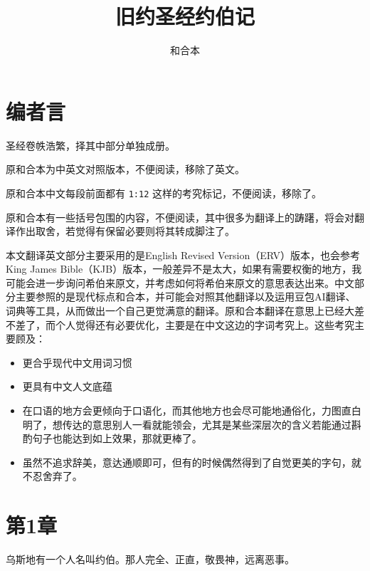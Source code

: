 \documentclass[12pt,oneside]{book}
\title{旧约圣经约伯记}
\author{和合本}
\begin{document}





\frontmatter
{}
\chapter*{编者言}
圣经卷帙浩繁，择其中部分单独成册。

原和合本为中英文对照版本，不便阅读，移除了英文。

原和合本中文每段前面都有 \verb+1:12+ 这样的考究标记，不便阅读，移除了。

原和合本有一些括号包围的内容，不便阅读，其中很多为翻译上的踌躇，将会对翻译作出取舍，若觉得有保留必要则将其转成脚注了。

本文翻译英文部分主要采用的是English Revised Version（ERV）版本，也会参考King James Bible（KJB）版本，一般差异不是太大，如果有需要权衡的地方，我可能会进一步询问希伯来原文，并考虑如何将希伯来原文的意思表达出来。中文部分主要参照的是现代标点和合本，并可能会对照其他翻译以及运用豆包AI翻译、词典等工具，从而做出一个自己更觉满意的翻译。原和合本翻译在意思上已经大差不差了，而个人觉得还有必要优化，主要是在中文这边的字词考究上。这些考究主要顾及：


\begin{itemize}
\item 更合乎现代中文用词习惯
\item 更具有中文人文底蕴
\item 在口语的地方会更倾向于口语化，而其他地方也会尽可能地通俗化，力图直白明了，想传达的意思别人一看就能领会，尤其是某些深层次的含义若能通过斟酌句子也能达到如上效果，那就更棒了。
\item 虽然不追求辞美，意达通顺即可，但有的时候偶然得到了自觉更美的字句，就不忍舍弃了。
\end{itemize}



\setcounter{tocdepth}{2}    
\tableofcontents

\mainmatter
\chapter{第1章}
乌斯地有一个人名叫约伯。那人完全、正直，敬畏神，远离恶事。
\end{document}
